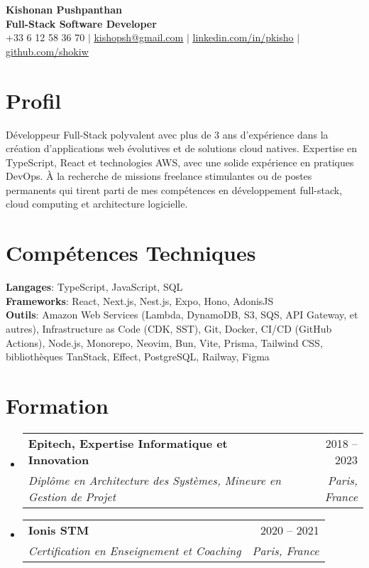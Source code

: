\documentclass[letterpaper,11pt]{article}
\makeatletter
\newcommand{\resumeSubheading}[4]{
  \vspace{-2pt}\item
    \begin{tabular*}{0.97\textwidth}[t]{l@{\extracolsep{\fill}}r}
      \textbf{#1} & #2 \\
      \textit{\small#3} & \textit{\small #4} \\
    \end{tabular*}\vspace{-7pt}
}
\newcommand{\resumeSubHeadingListStart}{\begin{itemize}[leftmargin=0.15in, label={}]}
\newcommand{\resumeSubHeadingListEnd}{\end{itemize}}
\makeatother
\begin{document}
\begin{center}
    \textbf{\LARGE Kishonan Pushpanthan} \\ \vspace{3pt}
    \textbf{\large Full-Stack Software Developer} \\ \vspace{10pt}
    \small +33 6 12 58 36 70 $|$ \href{mailto:kishopsh@gmail.com}{\underline{kishopsh@gmail.com}} $|$
    \href{https://linkedin.com/in/pkisho}{\underline{linkedin.com/in/pkisho}} $|$
    \href{https://github.com/shokiw}{\underline{github.com/shokiw}}
\end{center}

\section{Profil}
\small{
Développeur Full-Stack polyvalent avec plus de 3 ans d'expérience dans la création d'applications web évolutives et de solutions cloud natives. Expertise en TypeScript, React et technologies AWS, avec une solide expérience en pratiques DevOps. 
À la recherche de missions freelance stimulantes ou de postes permanents qui tirent parti de mes compétences en développement full-stack, cloud computing et architecture logicielle.
}

\section{Compétences Techniques}
 \begin{itemize}[leftmargin=0.15in, label={}]
    \small{\item{
     \textbf{Langages}{: TypeScript, JavaScript, SQL} \\
     \textbf{Frameworks}{: React, Next.js, Nest.js, Expo, Hono, AdonisJS} \\
     \textbf{Outils}{: Amazon Web Services (Lambda, DynamoDB, S3, SQS, API Gateway, et autres), Infrastructure as Code (CDK, SST), Git, Docker, CI/CD (GitHub Actions), Node.js, Monorepo, Neovim, Bun, Vite, Prisma, Tailwind CSS, bibliothèques TanStack, Effect, PostgreSQL, Railway, Figma} \\
    }}
 \end{itemize}

\section{Formation}
  \resumeSubHeadingListStart
    \resumeSubheading
      {Epitech, Expertise Informatique et Innovation}{2018 -- 2023}
      {Diplôme en Architecture des Systèmes, Mineure en Gestion de Projet}{Paris, France}
    \resumeSubheading
      {Ionis STM}{2020 -- 2021}
      {Certification en Enseignement et Coaching}{Paris, France}
  \resumeSubHeadingListEnd
\end{document}
